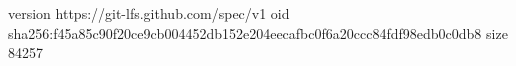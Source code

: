 version https://git-lfs.github.com/spec/v1
oid sha256:f45a85c90f20ce9cb004452db152e204eecafbc0f6a20ccc84fdf98edb0c0db8
size 84257
